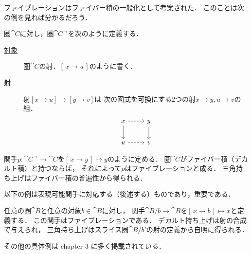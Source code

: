     ファイブレーションはファイバー積の一般化として考案された．
    このことは次の例を見れば分かるだろう．

    \begin{Example}\label{example:c_arrows}
        圏$\cat{C}$に対し，圏$\cat{C}^{\to}$を次のように定義する．
        \begin{description}
            \item[\underline{対象}] \mnewline
                圏$\cat{C}$の射．$[\, x \to u \,]$のように書く．

            \item[\underline{射}] \mnewline
            射$[x \to u] \to [y \to v]$は
            次の図式を可換にする$2$つの射$x \to y, u \to v$の組． 
            \[
            \begin{tikzcd}
                x \ar[r, dashed]\ar[d]& y \ar[d]\\
                u \ar[r, dashed]& v
            \end{tikzcd}
            \]
        \end{description}

        関手$p \colon \cat{C}^{\to} \to \cat{C}$を$[\, x \to y \,] \mapsto y$のように定める．
        圏$\cat{C}$がファイバー積（デカルト積）と持つならば，
        それによって$p$はファイブレーションと成る．
        三角持ち上げはファイバー積の普遍性から得られる．
    \end{Example}

    以下の例は表現可能関手に対応する（後述する）ものであり，重要である．
    \begin{Example}\label{example:rep_fibration}
        任意の圏$\cat{B}$と任意の対象$b \in \cat{B}$に対し，
        関手$\cat{B}/b \to \cat{B}$を$[\, x \to b \,] \mapsto x$と定義する．
        この関手はファイブレーションである．
        デカルト持ち上げは射の合成で与えられ，
        三角持ち上げはスライス圏$\cat{B}/b'$の射の定義から自明に得られる．
    \end{Example}
    
    その他の具体例は \cite{FGAexp} chapter 3 に多く掲載されている．

